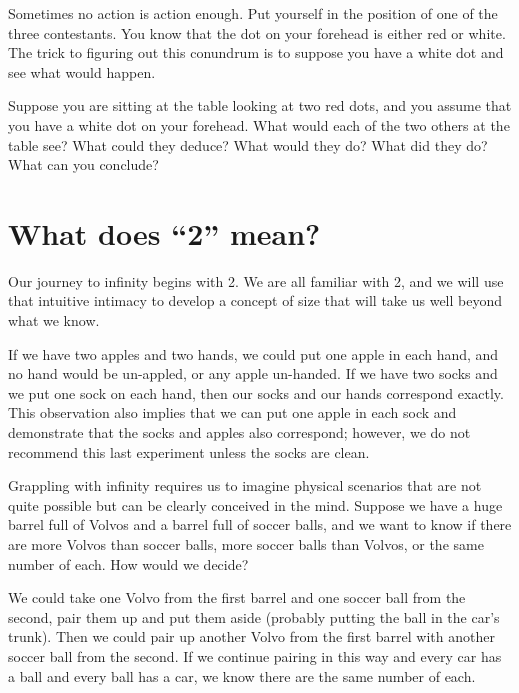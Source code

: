 \ifnudges
\hrulefill

Sometimes no action is action enough.  Put yourself in the position of one of the three contestants.  You know that the dot on your forehead is either red or white.  The trick to figuring out this conundrum is to suppose you have a white dot and see what would happen.

Suppose you are sitting at the table looking at two red dots, and you assume that you have a white dot on your forehead.  What would each of the two others at the table see?  What could they deduce?  What would they do?  What did they do? What can you conclude?
\fi

\clearpage

%
\section{What does ``2'' mean?} \label{sec:correspondence}

Our journey to infinity begins with 2. We are all familiar with 2, and we will use that intuitive
intimacy to develop a concept of size that will take us well beyond what we know.

If we have two apples and two hands, we could put one apple in each hand, and no hand would be un-appled, or any apple un-handed. If we have two socks and we put one sock on each hand, then our socks and
our hands correspond exactly. This observation also implies that we can put one apple in each sock and demonstrate that the socks and apples also correspond; however, we do not recommend this last experiment unless the socks are clean.


Grappling with infinity requires us to imagine physical scenarios that are not quite possible but can be clearly conceived in the mind. Suppose we have a huge barrel full of Volvos and a barrel full of soccer balls, and we want to know if there are more Volvos than soccer balls, more soccer
balls than Volvos, or the same number of each. How would we decide?

We could take one Volvo from the first barrel and one soccer ball from the second, pair them up and put them aside (probably putting the ball in the car's trunk). Then we could pair up another Volvo from the first barrel with another soccer ball from the second. If we continue pairing in this way and every car has a ball and every ball has a car, we know there are the same number of each.

